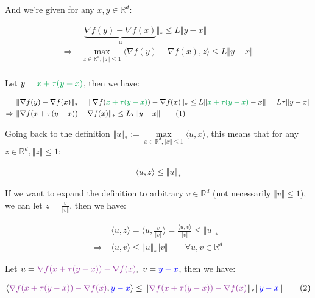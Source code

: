 \documentclass{article}
\begin{document}
And we're given for any $x, y \in \mathbb{R}^d$:

\begin{align*}
    &\Vert \underbrace{\nabla f ( y ) - \nabla f ( x )}_{\text{u}} \Vert_* \leq L \Vert y - x \Vert \\
    \Rightarrow \ &\max_{z \in \mathbb{R}^d, \Vert z \Vert \leq 1} \langle \nabla f ( y ) - \nabla f ( x ), z \rangle \leq L \Vert y - x \Vert \\
\end{align*}

Let $y = \textcolor{Green}{x + \tau ( y - x )}$, then we have:

\begin{align*}
    &\Vert \nabla f ( y ) - \nabla f ( x ) \Vert_* = \Vert \nabla f ( \textcolor{Green}{x + \tau ( y - x )} ) - \nabla f ( x ) \Vert_* \leq L \Vert \textcolor{Green}{x + \tau ( y - x )} - x \Vert = L \tau \Vert y - x \Vert \\
    \Rightarrow \ &\Vert \nabla f ( x + \tau ( y - x ) ) - \nabla f ( x ) \Vert_* \leq L \tau \Vert y - x \Vert \tag{1}
\end{align*}

Going back to the definition $\Vert u \Vert_* := \underset{x \in \mathbb{R}^d, \Vert x \Vert \leq 1}{\max} \langle u, x \rangle$, 
this means that for any $z \in \mathbb{R}^d, \Vert z \Vert \leq 1$:

\begin{align*}
    \langle u, z \rangle \leq \Vert u \Vert_*
\end{align*}

If we want to expand the definition to arbitrary $v \in \mathbb{R}^d$ (not necessarily $\Vert v \Vert \leq 1$), 
we can let $z = \frac{v}{\Vert v \Vert}$, then we have:

\begin{align*}
    &\langle u, z \rangle = \langle u, \frac{v}{\Vert v \Vert} \rangle = \frac{\langle u, v \rangle}{\Vert v \Vert} \leq \Vert u \Vert_* \\
    \Rightarrow \ &\langle u, v \rangle \leq \Vert u \Vert_* \Vert v \Vert \qquad \forall u, v \in \mathbb{R}^d
\end{align*}

Let $u = \textcolor{Purple}{\nabla f ( x + \tau ( y - x ) ) - \nabla f ( x )}, \ v = \textcolor{blue}{y - x}$, then we have:

\begin{align*}
    \langle \textcolor{Purple}{\nabla f ( x + \tau ( y - x ) ) - \nabla f ( x )}, \textcolor{blue}{y - x} \rangle \leq \Vert \textcolor{Purple}{\nabla f ( x + \tau ( y - x ) ) - \nabla f ( x )} \Vert_* \Vert \textcolor{blue}{y - x} \Vert \tag{2}
\end{align*}
\end{document}
